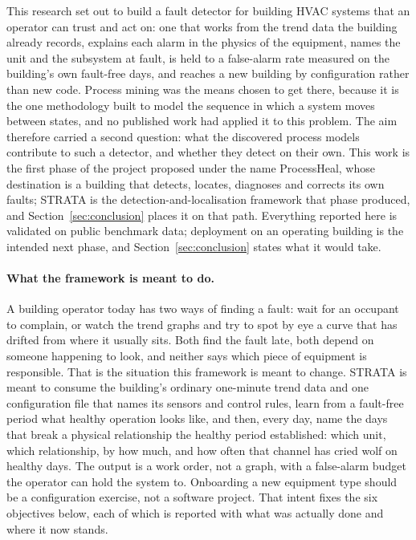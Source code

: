 \documentclass[11pt,letterpaper]{article}
\begin{document}
This research set out to build a fault detector for building HVAC systems that an operator can trust and act on: one that works from the trend data the building already records, explains each alarm in the physics of the equipment, names the unit and the subsystem at fault, is held to a false-alarm rate measured on the building's own fault-free days, and reaches a new building by configuration rather than new code. Process mining was the means chosen to get there, because it is the one methodology built to model the sequence in which a system moves between states, and no published work had applied it to this problem. The aim therefore carried a second question: what the discovered process models contribute to such a detector, and whether they detect on their own. This work is the first phase of the project proposed under the name ProcessHeal, whose destination is a building that detects, locates, diagnoses and corrects its own faults; STRATA is the detection-and-localisation framework that phase produced, and Section~\ref{sec:conclusion} places it on that path. Everything reported here is validated on public benchmark data; deployment on an operating building is the intended next phase, and Section~\ref{sec:conclusion} states what it would take.

\paragraph{What the framework is meant to do.} A building operator today has two ways of finding a fault: wait for an occupant to complain, or watch the trend graphs and try to spot by eye a curve that has drifted from where it usually sits. Both find the fault late, both depend on someone happening to look, and neither says which piece of equipment is responsible. That is the situation this framework is meant to change. STRATA is meant to consume the building's ordinary one-minute trend data and one configuration file that names its sensors and control rules, learn from a fault-free period what healthy operation looks like, and then, every day, name the days that break a physical relationship the healthy period established: which unit, which relationship, by how much, and how often that channel has cried wolf on healthy days. The output is a work order, not a graph, with a false-alarm budget the operator can hold the system to. Onboarding a new equipment type should be a configuration exercise, not a software project. That intent fixes the six objectives below, each of which is reported with what was actually done and where it now stands.
\end{document}
